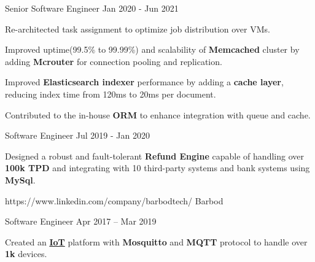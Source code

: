 \documentclass[
	10pt, %
]{FreemanCV}
\begin{document}
\begin{paracol}{2}
\position
{Senior Software Engineer}
{Jan 2020 - Jun 2021}
{
\item Re-architected task assignment to optimize job distribution over VMs.
\item Improved uptime(99.5\% to 99.99\%) and scalability of \textbf{Memcached} cluster by adding \textbf{Mcrouter} for connection pooling and replication.
\item Improved \textbf{Elasticsearch indexer} performance by adding a \textbf{cache layer}, reducing index time from 120ms to 20ms per document.
\item Contributed to the in-house \textbf{ORM} to enhance integration with queue and cache.
}


\position
{Software Engineer}
{Jul 2019 - Jan 2020}
{
\item  Designed a robust and fault-tolerant \textbf{Refund Engine} capable of handling over \textbf{100k TPD} and integrating with 10 third-party systems and bank systems using \textbf{MySql}.
}

\vspace{5pt}
\company
{https://www.linkedin.com/company/barbodtech/}
{Barbod}
{}


\position
{Software Engineer}
{Apr 2017 – Mar 2019}
{
\item Created an \href{https://en.wikipedia.org/wiki/Internet_of_things}{\textbf{IoT}} platform with \textbf{Mosquitto} and \textbf{MQTT} protocol to handle over \textbf{1k} devices.
}



\switchcolumn %



\end{paracol}
\end{document}
